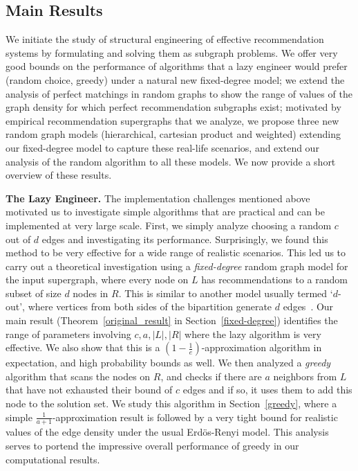 \subsection{Main Results}
We initiate the study of structural engineering of effective
recommendation systems by formulating and solving them as subgraph
problems. We offer very good bounds on the performance of algorithms
that a lazy engineer would prefer (random choice, greedy) under a
natural new fixed-degree model; we extend the analysis of perfect
matchings in random graphs to show the range of values of the graph
density for which perfect recommendation subgraphs exist; motivated by
empirical recommendation supergraphs that we analyze, we propose three
new random graph models (hierarchical, cartesian product and weighted)
extending our fixed-degree model to capture these real-life scenarios,
and extend our analysis of the random algorithm to all these
models. We now provide a short overview of these results.

\noindent
{\bf The Lazy Engineer.} The implementation challenges mentioned above
motivated us to investigate simple algorithms that are practical and can
be implemented at very large scale. First, we simply analyze choosing a random
$c$ out of $d$ edges and investigating its performance.  Surprisingly,
we found this method to be very effective for a wide range of
realistic scenarios. This led us to carry out a theoretical
investigation using a {\em fixed-degree} random graph model for the
input supergraph, where every node on $L$ has recommendations to a
random subset of size $d$ nodes in $R$.  This is similar to another
model usually termed `$d$-out', where vertices from both sides of the
bipartition generate $d$ edges~\cite{FriezePittel2004}. Our main
result (Theorem~\ref{original_result} in Section~\ref{fixed-degree})
identifies the range of parameters involving $c,a,|L|, |R|$ where the
lazy algorithm is very effective. We also show that this is a
$(1-\frac1e)$-approximation algorithm in expectation, and high
probability bounds as well.  We then analyzed a {\em greedy} algorithm
that scans the nodes on $R$, and checks
if there are $a$ neighbors from $L$ that have not exhausted their
bound of $c$ edges and if so, it uses them to add
this node to the solution set. We study this algorithm in
Section~\ref{greedy}, where a simple $\frac{1}{a+1}$-approximation
result is followed by a very tight bound for realistic values of the
edge density under the usual Erd\"os-Renyi
model\cite{ErdosRenyi59}. This analysis serves to portend the
impressive overall performance of greedy in our computational
results. \vs

